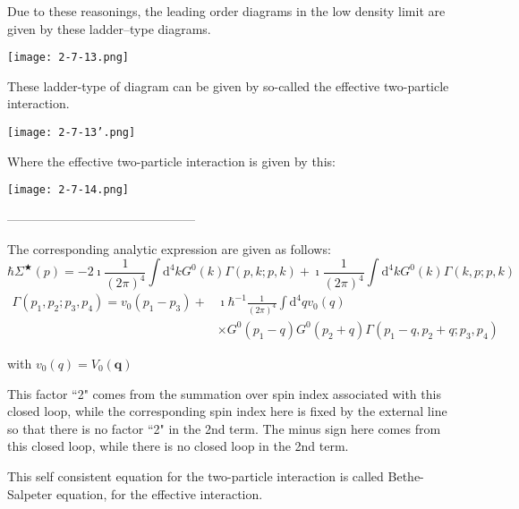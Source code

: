 Due to these reasonings, the leading order diagrams in the low density limit are given by these ladder--type diagrams.
\begin{center}
\texttt{[image: 2-7-13.png]}\label{Fig2.7.13}
\end{center}

These ladder-type of diagram can be given by so-called the effective two-particle interaction.
\begin{center}
\texttt{[image: 2-7-13'.png]}\label{Fig2.7.13'}
\begin{equation} \label{Eqs2.7.4}\end{equation}
\end{center}

Where the effective two-particle interaction is given by this:
\begin{center}
\texttt{[image: 2-7-14.png]}\label{Fig2.7.14}
\begin{equation} \label{Eqs2.7.5}\end{equation}
\end{center}
\begin{center}---------------------------------------------\end{center}
The corresponding analytic expression are given as follows:
\begin{equation*} \label{Eqs2.7.4'} \tag{2.7.4'} \hbar\Sigma^{\bigstar}(p) = -2 \imath \frac{1}{(2\pi)^4} \int \mathrm{d}^4 k G^0(k) \Gamma(p,k;p,k)+\imath \frac{1}{(2\pi)^4}\int \mathrm{d}^4 k G^0(k) \Gamma(k,p;p,k) \end{equation*}
\begin{equation} \label{Eqs2.7.6} \begin{split}
\Gamma(p_1,p_2;p_3,p_4) = v_0(p_1-p_3) + &\imath \hbar^{-1} \frac{1}{(2\pi)^4} \int \mathrm{d}^4 q v_0(q) \\
&\times G^0(p_1-q)G^0(p_2+q)\Gamma(p_1-q,p_2+q;p_3,p_4)
\end{split}\end{equation}

with $v_0(q) = V_0(\mathbf{q})$

This factor ``2" comes from the summation over spin index associated with this closed loop, while the corresponding spin index here is fixed by the external line so that there is no factor ``2" in the 2nd term. The minus sign here comes from this closed loop, while there is no closed loop in the 2nd term.

This self consistent equation for the two-particle interaction is called Bethe-Salpeter equation, for the effective interaction.

